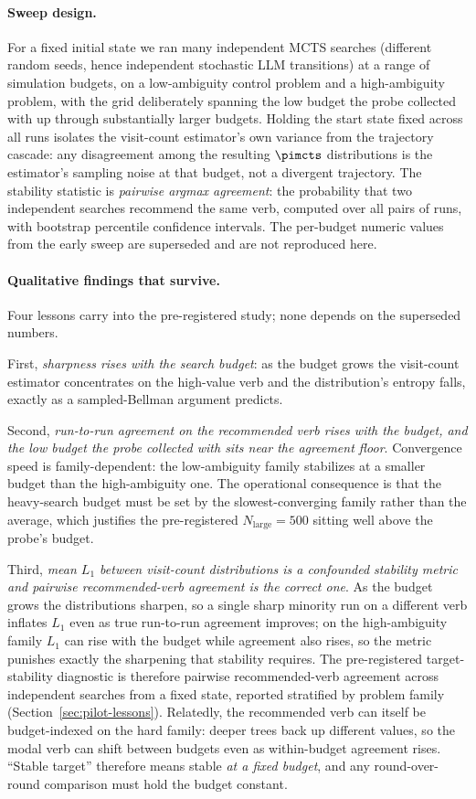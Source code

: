 \paragraph{Sweep design.} For a fixed initial state we ran many independent MCTS
searches (different random seeds, hence independent stochastic LLM transitions)
at a range of simulation budgets, on a low-ambiguity control problem and a
high-ambiguity problem, with the grid deliberately spanning the low budget the
probe collected with up through substantially larger budgets. Holding the start
state fixed across all runs isolates the visit-count estimator's own variance
from the trajectory cascade: any disagreement among the resulting $\pimcts$
distributions is the estimator's sampling noise at that budget, not a divergent
trajectory. The stability statistic is \emph{pairwise argmax agreement}: the
probability that two independent searches recommend the same verb, computed over
all pairs of runs, with bootstrap percentile confidence intervals. The
per-budget numeric values from the early sweep are superseded and are not
reproduced here.

\paragraph{Qualitative findings that survive.} Four lessons carry into the
pre-registered study; none depends on the superseded numbers.

First, \emph{sharpness rises with the search budget}: as the budget grows the
visit-count estimator concentrates on the high-value verb and the distribution's
entropy falls, exactly as a sampled-Bellman argument predicts.

Second, \emph{run-to-run agreement on the recommended verb rises with the
budget, and the low budget the probe collected with sits near the agreement
floor}. Convergence speed is family-dependent: the low-ambiguity family
stabilizes at a smaller budget than the high-ambiguity one. The operational
consequence is that the heavy-search budget must be set by the
slowest-converging family rather than the average, which justifies the
pre-registered $N_{\mathrm{large}} = 500$ sitting well above the probe's budget.

Third, \emph{mean $L_1$ between visit-count distributions is a confounded
stability metric and pairwise recommended-verb agreement is the correct one}. As
the budget grows the distributions sharpen, so a single sharp minority run on a
different verb inflates $L_1$ even as true run-to-run agreement improves; on the
high-ambiguity family $L_1$ can rise with the budget while agreement also rises,
so the metric punishes exactly the sharpening that stability requires. The
pre-registered target-stability diagnostic is therefore pairwise
recommended-verb agreement across independent searches from a fixed state,
reported stratified by problem family (Section~\ref{sec:pilot-lessons}).
Relatedly, the recommended verb can itself be budget-indexed on the hard family:
deeper trees back up different values, so the modal verb can shift between
budgets even as within-budget agreement rises. ``Stable target'' therefore means
stable \emph{at a fixed budget}, and any round-over-round comparison must hold
the budget constant.

